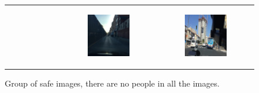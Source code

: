 \begin{figure}
\begin{tabular}{p{\horspace} p{\horspace} p{\horspace}}
\begin{subfigure}[b]{\subfigwidth}
    \end{subfigure}
    \hfill &
    \begin{subfigure}[b]{\subfigwidth}
        \includegraphics[width=\subfigwidth]{images/gpt4/s5.jpg}
    \end{subfigure} 
    \hfill &
    \begin{subfigure}[b]{\subfigwidth}
        \includegraphics[width=\subfigwidth]{images/gpt4/s6.jpg}
    \end{subfigure}
\end{tabular}
\caption[Group of safe images for common features' extraction.]
{Group of safe images, there are no people in all the images.}
\label{fig:safe_group}
\end{figure}
